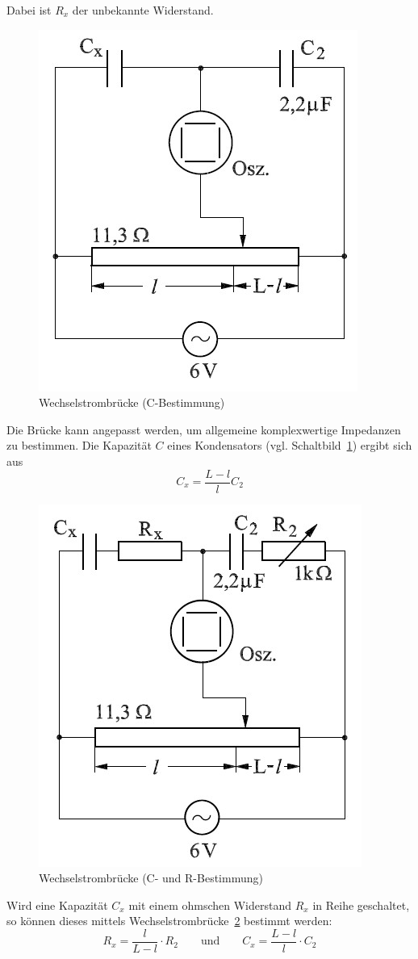 Dabei ist $R_x$ der unbekannte Widerstand.
\begin{figure}[H]
  \centering
  \includegraphics[width=.5\textwidth]{wheatC.jpg}
  \caption{Wechselstrombrücke (C-Bestimmung)}
  \label{fig:wheatC}
\end{figure}
Die Brücke kann angepasst werden, um allgemeine komplexwertige Impedanzen zu bestimmen. Die Kapazität $C$ eines Kondensators (vgl. Schaltbild~\cref{fig:wheatC}) ergibt sich aus
\begin{equation}
  C_x=\frac{L-l}{l}C_2
  \label{eq:wheatkondensator}
\end{equation}
\begin{figure}[H]
  \centering
  \includegraphics[width=.5\textwidth]{wheatCR.jpg}
  \caption{Wechselstrombrücke (C- und R-Bestimmung)}
  \label{fig:wheatCR}
\end{figure}
Wird eine Kapazität $C_x$ mit einem ohmschen Widerstand $R_x$ in Reihe geschaltet, so können dieses mittels Wechselstrombrücke~\cref{fig:wheatCR} bestimmt werden:
\begin{equation}
  R_x=\frac{l}{L-l}\cdot R_2 \qquad \text{und} \qquad C_x=\frac{L-l}{l}\cdot C_2
  \label{eq:wheatCR}
\end{equation}
